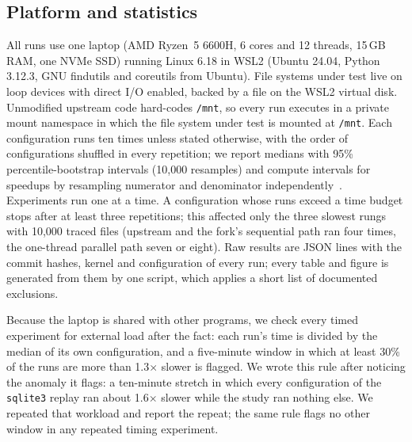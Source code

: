 \subsection{Platform and statistics}
All runs use one laptop (AMD Ryzen~5 6600H, 6 cores and 12 threads, 15\,GB RAM, one
NVMe SSD) running Linux 6.18 in WSL2 (Ubuntu 24.04, Python 3.12.3, GNU findutils and
coreutils from Ubuntu). File systems under test live on loop devices with direct
I/O enabled, backed by a file on the WSL2 virtual disk. Unmodified upstream code
hard-codes \texttt{/mnt}, so every run executes in a private mount namespace in
which the file system under test is mounted at \texttt{/mnt}. Each configuration
runs ten times unless stated otherwise, with the order of configurations shuffled
in every repetition; we report medians with 95\% percentile-bootstrap intervals
(10{,}000 resamples) and compute intervals for speedups by resampling numerator and
denominator independently~\cite{hoefler2015scientific}. Experiments run one at a time.
A configuration whose runs exceed a time budget stops after at least three
repetitions; this affected only the three slowest rungs with 10{,}000 traced files
(upstream and the fork's sequential path ran four times, the one-thread parallel path
seven or eight). Raw results are JSON lines with the commit hashes,
kernel and configuration of every run; every table and figure is generated from them
by one script, which applies a short list of documented exclusions.

Because the laptop is shared with other programs, we check every timed experiment for
external load after the fact: each run's time is divided by the median of its own
configuration, and a five-minute window in which at least 30\% of the runs are more
than 1.3$\times$ slower is flagged. We wrote this rule after noticing the anomaly it
flags: a ten-minute stretch in which every configuration of the \texttt{sqlite3}
replay ran about 1.6$\times$ slower while the study ran nothing else. We repeated that
workload and report the repeat; the same rule flags no other window in any repeated
timing experiment.
